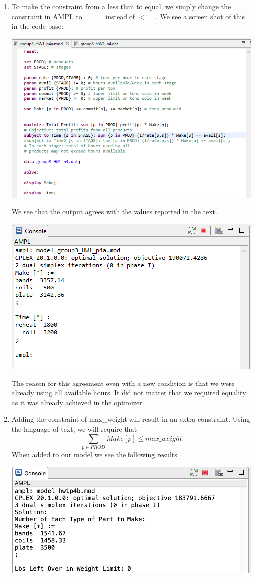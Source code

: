 \documentclass[11pt]{article}
\begin{document}
\begin{enumerate}
\begin{enumerate}
\item To make the constraint from a less than to equal, we simply change the constraint in AMPL to $==$ instead of $<=$.  We see a screen shot of this in the code base:

\includegraphics[width = .9\textwidth]{outputp4a1.png}

We see that the output agrees with the values reported in the text.

\includegraphics[width = .9\textwidth]{outputp4a2.png}

The reason for this agreement even with a new condition is that we were already using all available hours.  It did not matter that we required equality as it was already achieved in the optimizer.
\item Adding the constraint of max\_weight will result in an extra constraint.  Using the language of text, we will require that
\[
\sum_{p \in PROD}Make[p] \leq max\_weight
\]
When added to our model we see the following results

\includegraphics[width = .9\textwidth]{outputp4b.png}


\end{enumerate}
\end{enumerate}
\end{document}
